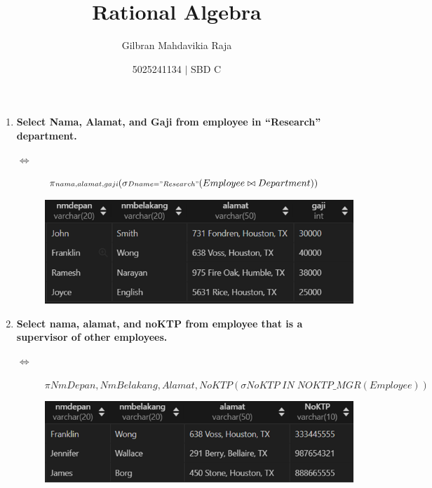 \documentclass{extarticle}
\title{Rational Algebra}
\author{Gilbran Mahdavikia Raja}
\date{5025241134 $|$ SBD C}
\begin{document}
\maketitle

\begin{enumerate}
\item {\textbf{Select Nama, Alamat, and Gaji from employee in “Research” department.}}
\begin{description} 
    \item[$\Leftrightarrow$] {\large $\pi {\scriptstyle nama,alamat,gaji}(\sigma{\scriptstyle Dname="Research"}(Employee \bowtie Department))$}   
    \item[] \includegraphics[scale=0.7]{1.png}
\end{description}

\item {\textbf{Select nama, alamat, and noKTP from employee that is a supervisor of other employees.}}
\begin{description} 
    \item[$\Leftrightarrow$] {\large $\pi {\scriptstyle NmDepan,NmBelakang,Alamat,NoKTP}(\sigma{\scriptstyle NoKTP \;IN \; NOKTP\_MGR}(Employee))$}   
    \item[] \includegraphics[scale=0.7]{2.png}
\end{description}


\end{enumerate}
\end{document}
